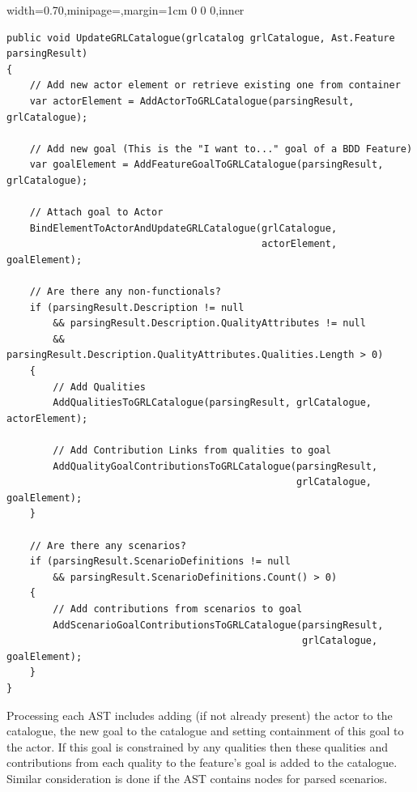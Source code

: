 \documentclass[dissertation,final]{softeng}
\newenvironment{featurecode}[1]
{ \lrbox\featurebox \begin{adjustbox}{width=#1\textwidth,minipage=\textwidth,margin=1cm 0 0 0,inner} }
{ \end{adjustbox}\endlrbox}
\newenvironment{featurelist}[2]
{
\newcommand{\setcaption}{\caption{#1}}
\newcommand{\setlabel}{\label{#2}}
}
{\begin{listing}[h!]\centering\usebox\featurebox\setcaption\setlabel\end{listing}}
\begin{document}
\begin{featurelist}{Translator to GRL -- update catalogue with AST}{lst:translator_to_grl_update_with_AST}
\begin{featurecode}{0.70}
\begin{verbatim}
public void UpdateGRLCatalogue(grlcatalog grlCatalogue, Ast.Feature parsingResult)
{
    // Add new actor element or retrieve existing one from container
    var actorElement = AddActorToGRLCatalogue(parsingResult, grlCatalogue);
    
    // Add new goal (This is the "I want to..." goal of a BDD Feature)
    var goalElement = AddFeatureGoalToGRLCatalogue(parsingResult, grlCatalogue);
    
    // Attach goal to Actor
    BindElementToActorAndUpdateGRLCatalogue(grlCatalogue, 
                                            actorElement, goalElement);
    
    // Are there any non-functionals?
    if (parsingResult.Description != null 
        && parsingResult.Description.QualityAttributes != null 
        && parsingResult.Description.QualityAttributes.Qualities.Length > 0)
    {
        // Add Qualities
        AddQualitiesToGRLCatalogue(parsingResult, grlCatalogue, actorElement);
    
        // Add Contribution Links from qualities to goal
        AddQualityGoalContributionsToGRLCatalogue(parsingResult, 
                                                  grlCatalogue, goalElement);
    }
    
    // Are there any scenarios?
    if (parsingResult.ScenarioDefinitions != null 
        && parsingResult.ScenarioDefinitions.Count() > 0) 
    {
        // Add contributions from scenarios to goal
        AddScenarioGoalContributionsToGRLCatalogue(parsingResult,
                                                   grlCatalogue, goalElement);
    }
}
\end{verbatim}
\end{featurecode}
\end{featurelist}

Processing each AST includes adding (if not already present) the actor to the catalogue, the new goal to the catalogue and setting containment of this goal to the actor. If this goal is constrained by any qualities then these qualities and contributions from each quality to the feature's goal is added to the catalogue. Similar consideration is done if the AST contains nodes for parsed scenarios. 
\end{document}
